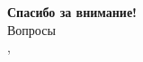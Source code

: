 \begin{frame}
    \centering
    \vfill
    {\Huge\color{MIPTBlue}\textbf{Спасибо за внимание!}}\\[1.2em]
    {\Large Вопросы}
    \vfill
    \thesisAuthor\\
    \thesisOrganizationShort, \thesisYear
\end{frame}

